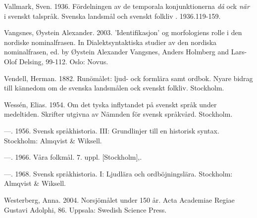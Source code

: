 \begin{styleBodytextC}
Vallmark, Sven. 1936. Fördelningen av de temporala konjunktionerna \textit{då} ock \textit{när} i svenskt talspråk. Svenska landsmål och svenskt folkliv . 1936.119-159.

\end{styleBodytextC}

\begin{styleBodytextC}
Vangsnes, Øystein Alexander. 2003. 'Identifikasjon' og morfologiens rolle i den nordiske nominalfrasen. In Dialektsyntaktiska studier av den nordiska nominalfrasen, ed. by Øystein Alexander Vangsnes, Anders Holmberg and Lars-Olof Delsing, 99-112. Oslo: Novus.

\end{styleBodytextC}

\begin{styleBodytextC}
Vendell, Herman. 1882. Runömålet: ljud- ock formlära samt ordbok. Nyare bidrag till kännedom om de svenska landsmålen ock svenskt folkliv. Stockholm.

\end{styleBodytextC}

\begin{styleBodytextC}
Wessén, Elias. 1954. Om det tyska inflytandet på svenskt språk under medeltiden. Skrifter utgivna av Nämnden för svensk språkvård. Stockholm.

\end{styleBodytextC}

\begin{styleBodytextC}
—. 1956. Svensk språkhistoria. III: Grundlinjer till en historisk syntax. Stockholm: Almqvist \& Wiksell.

\end{styleBodytextC}

\begin{styleBodytextC}
—.  1966. Våra folkmål.  7. uppl. [Stockholm],.

\end{styleBodytextC}

\begin{styleBodytextC}
—. 1968. Svensk språkhistoria.  I: Ljudlära och ordböjningslära. Stockholm: Almqvist \& Wiksell.

\end{styleBodytextC}

\begin{styleBodytextC}
Westerberg, Anna. 2004. Norsjömålet under 150 år. Acta Academiae Regiae Gustavi Adolphi, 86. Uppsala: Swedish Science Press.

\end{styleBodytextC}

